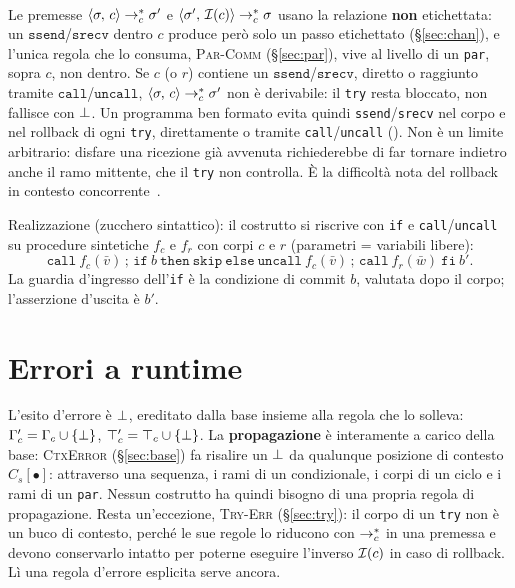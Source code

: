 \paragraph{} Le premesse
$\cfg{c}{\sigma} \toc^{*} \sigma'$ e $\cfg{\Inv{c}}{\sigma'} \toc^{*} \sigma$
usano la relazione \textbf{non} etichettata: un $\mathtt{ssend}$/$\mathtt{srecv}$
dentro $c$ produce però solo un passo etichettato (\S\ref{sec:chan}), e
l'unica regola che lo consuma, \textsc{Par-Comm} (\S\ref{sec:par}), vive al
livello di un \texttt{par}, sopra $c$, non dentro. Se $c$ (o $r$) contiene
un $\mathtt{ssend}$/$\mathtt{srecv}$, diretto o raggiunto tramite
$\mathtt{call}$/$\mathtt{uncall}$, $\cfg{c}{\sigma} \toc^{*} \sigma'$ non è
derivabile: il \texttt{try} resta bloccato, non fallisce con $\err$. Un
programma ben formato evita quindi \texttt{ssend}/\texttt{srecv} nel corpo e
nel rollback di ogni \texttt{try}, direttamente o tramite
\texttt{call}/\texttt{uncall} (). Non è un
limite arbitrario: disfare una ricezione già avvenuta richiederebbe di far
tornare indietro anche il ramo mittente, che il \texttt{try} non controlla. È
la difficoltà nota del rollback in contesto
concorrente~\cite{LaneseMezzinaSchmittStefani2011,%
LaneseLienhardtMezzinaSchmittStefani2013}.

\noindent
Realizzazione (zucchero sintattico): il costrutto si riscrive con \texttt{if}
e \texttt{call}/\texttt{uncall} su procedure sintetiche $f_c$ e $f_r$ con corpi
$c$ e $r$ (parametri = variabili libere):
\[
\mathtt{call}\ f_c(\bar v)\,;\,
\mathtt{if}\ b\ \mathtt{then}\ \mathtt{skip}\ \mathtt{else}\
   \mathtt{uncall}\ f_c(\bar v)\,;\, \mathtt{call}\ f_r(\bar w)\ \mathtt{fi}\ b' .
\]
La guardia d'ingresso dell'\texttt{if} è la condizione di commit $b$, valutata
dopo il corpo; l'asserzione d'uscita è $b'$.

\section{Errori a runtime}
\label{sec:err}

L'esito d'errore è $\err$, ereditato dalla base insieme alla regola che lo
solleva: $\Gamma_c' = \Gamma_c \cup \{\err\}$, $\top_c' = \top_c \cup
\{\err\}$. La \textbf{propagazione} è interamente a carico della base:
\textcolor{red!60!black}{\textsc{CtxError}} (\S\ref{sec:base}) fa risalire un
$\err$ da qualunque posizione di contesto $C_s[\bullet]$: attraverso una
sequenza, i rami di un condizionale, i corpi di un ciclo e i rami di un
\texttt{par}. Nessun costrutto ha quindi bisogno di una propria
regola di propagazione. Resta un'eccezione, \textcolor{red!60!black}{\textsc{Try-Err}}
(\S\ref{sec:try}): il corpo di un \texttt{try} non è un buco di contesto,
perché le sue regole lo riducono con $\toc^{*}$ in una premessa e devono
conservarlo intatto per poterne eseguire l'inverso $\Inv{c}$ in caso di
rollback. Lì una regola d'errore esplicita serve ancora.


